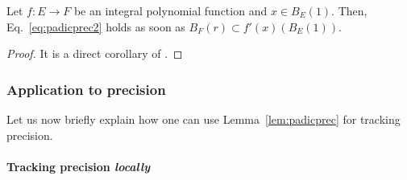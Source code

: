 \documentclass{article}
\begin{document}
\begin{prop}
\label{prop:padicprec}
Let $f : E \to F$ be an integral polynomial function and $x \in B_E(1)$. 
Then, Eq.~\eqref{eq:padicprec2} holds as soon as 
$B_F(r) \subset f'(x)(B_E(1))$.
\end{prop}

\begin{proof}
It is a direct corollary of \cite[Proposition 3.12]{padicprec}.
\end{proof}

\subsubsection{Application to precision}

Let us now briefly explain how one can use Lemma~\ref{lem:padicprec} for 
tracking precision. 

\paragraph{Tracking precision \emph{locally}}
\end{document}
